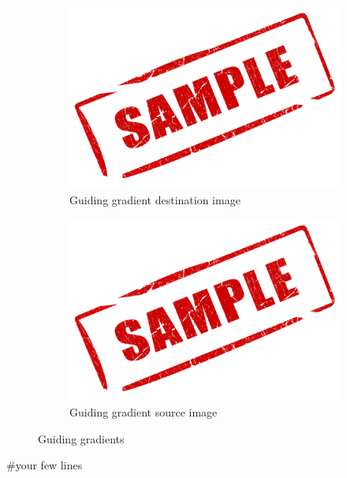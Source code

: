 \documentclass[paper=a4, fontsize=12pt]{scrartcl} %
\numberwithin{equation}{section}       %
\numberwithin{figure}{section}         %
\numberwithin{table}{section}          %
\begin{document}
\begin{figure}[H]
    \centering
    \begin{subfigure}[b]{0.45\textwidth}
        \includegraphics[width=\textwidth]{sample}
        \caption{ Guiding gradient destination image}
    \end{subfigure}
    \begin{subfigure}[b]{0.45\textwidth}
        \includegraphics[width=\textwidth]{sample}
        \caption{Guiding gradient source image}
    \end{subfigure}
    \caption{Guiding gradients}
\end{figure}

 \begin{tcolorbox}
 
\begin{python}
#your few lines
\end{python}
 \end{tcolorbox}
 
\end{document}
